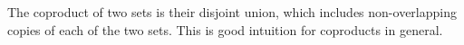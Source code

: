 \documentclass[CT4S-EN-RU]{subfiles}
\begin{document}
\begin{exampleRUS}\label{ex:[1]x[1]}
\end{exampleRUS}


\subsubsection{}

\begin{blockENG}
The coproduct of two sets is their disjoint union, which includes non-overlapping copies of each of the two sets. This is good intuition for coproducts in general.
\end{blockENG}

\begin{blockRUS}
\end{blockRUS}
\end{document}
